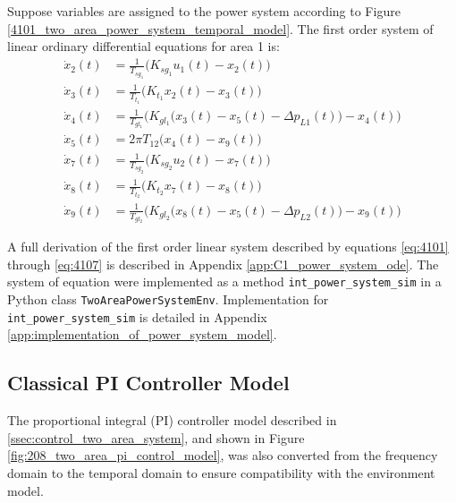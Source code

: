 Suppose variables are assigned to the power system according to Figure \ref{4101_two_area_power_system_temporal_model}. The first order system of linear ordinary differential equations for area 1 is:
\begin{align}
	\dot{x}_2(t) &= \frac{1}{T_{sg_1}}\big( K_{sg_1} u_1(t) - x_2(t) \big) \label{eq:4101} \\
	\dot{x}_3(t) &= \frac{1}{T_{t_1}} \big( K_{t_1} x_2(t) - x_3(t) \big) \label{eq:4102} \\
	\dot{x}_4(t) &= \frac{1}{T_{gl_1}} \bigg( K_{gl_1} \big( x_3(t) - x_5(t) - \Delta p_{L1}(t) \big) - x_4(t) \bigg) \label{eq:4103}  \\
	\dot{x}_5(t) &= 2 \pi T_{12} \big( x_4(t) - x_9(t) \big) \label{eq:4104} \\
	\dot{x}_7(t) &= \frac{1}{T_{sg_2}}\big( K_{sg_2} u_2(t) - x_7(t) \big) \label{eq:4105} \\
	\dot{x}_8(t) &= \frac{1}{T_{t_2}} \big( K_{t_2} x_7(t) - x_8(t) \big) \label{eq:4106} \\
	\dot{x}_9(t) &= \frac{1}{T_{gl_2}} \bigg( K_{gl_2} \big( x_8(t) - x_5(t) - \Delta p_{L2}(t) \big) - x_9(t) \bigg) \label{eq:4107}
\end{align}

A full derivation of the first order linear system described by equations \ref{eq:4101} through \ref{eq:4107} is described in Appendix \ref{app:C1_power_system_ode}. The system of equation were implemented as a method \verb|int_power_system_sim| in a Python class \verb|TwoAreaPowerSystemEnv|. Implementation for \verb|int_power_system_sim| is detailed in Appendix \ref{app:implementation_of_power_system_model}.




\subsection{Classical PI Controller Model}
The proportional integral (PI) controller model described in \textsection \ref{ssec:control_two_area_system}, and shown in Figure \ref{fig:208_two_area_pi_control_model}, was also converted from the frequency domain to the temporal domain to ensure compatibility with the environment model.

\begin{figure}[h]
	\begin{minipage}[b]{0.5\textwidth}
		\resizebox{7.0cm}{!}{}
		\caption{}
		\label{fig:4102_two_area_pi_controller_temporal_1}
	\end{minipage}
	\hspace{0.1cm}
	\begin{minipage}[b]{0.5\textwidth}
		\resizebox{7.2cm}{!}{}
		\caption{}
		\label{fig:4103_two_area_pi_controller_temporal_2}
	\end{minipage}
\end{figure}

